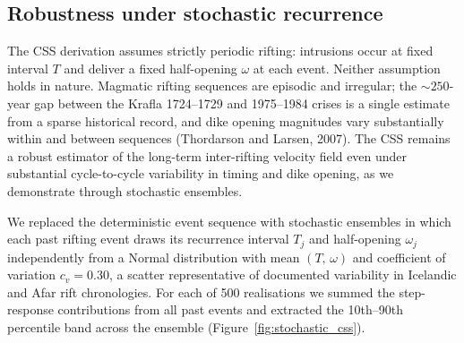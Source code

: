 \documentclass[12pt]{article}
\begin{document}
\subsection{Robustness under stochastic recurrence}
\label{sec:disc_stochastic}

The CSS derivation assumes strictly periodic rifting: intrusions occur at
fixed interval $T$ and deliver a fixed half-opening $\omega$ at each event.
Neither assumption holds in nature.  Magmatic rifting sequences are episodic
and irregular; the $\sim250$-year gap between the Krafla 1724--1729 and
1975--1984 crises is a single estimate from a sparse historical record, and
dike opening magnitudes vary substantially within and between sequences
(Thordarson and Larsen, 2007).  The CSS remains a robust estimator of
the long-term inter-rifting velocity field even under substantial
cycle-to-cycle variability in timing and dike opening, as we demonstrate
through stochastic ensembles.

We replaced the deterministic event sequence with stochastic ensembles in
which each past rifting event draws its recurrence interval $T_j$ and
half-opening $\omega_j$ independently from a Normal distribution with mean
$(T,\,\omega)$ and coefficient of variation $c_v = 0.30$, a scatter
representative of documented variability in Icelandic and Afar rift
chronologies.  For each of 500 realisations we summed the step-response
contributions from all past events and extracted the 10th--90th percentile
band across the ensemble (Figure~\ref{fig:stochastic_css}).
\end{document}
